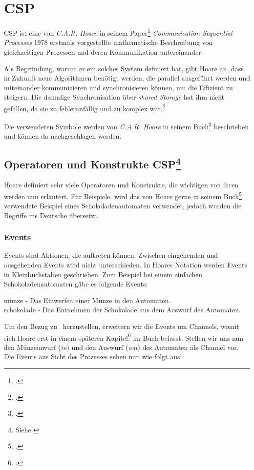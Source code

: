 \section{\acl{CSP}}
\acf{CSP} ist eine von \textit{C.A.R. Hoare} in seinem Paper\footcite{CSP} \textit{Communication Sequential Processes} 1978 erstmals vorgestellte mathematische Beschreibung von gleichzeitigen Prozessen und deren Kommunikation untereinander.

Als Begründung, warum er ein solches System definiert hat, gibt Hoare an, dass in Zukunft neue Algorithmen benötigt werden, die parallel ausgeführt werden und miteinander kommunizieren und synchronisieren können, um die Effizient zu steigern. Die damalige Synchronisation über \textit{shared Storage} hat ihm nicht gefallen, da sie zu fehleranfällig und zu komplex war.\footcite[Introduction]{CSP}

Die verwendeten Symbole werden von \textit{C.A.R. Hoare} in seinem Buch\footcite[Glossary of Symbols]{CSPBOOK} beschrieben und können da nachgeschlagen werden.
\subsection[Operatoren und Konstrukte \acs{CSP}]{Operatoren und Konstrukte \acs{CSP}\footnote{Siehe \cite[Kapitel 1.1]{CSPBOOK}}}

Hoare definiert sehr viele Operatoren und Konstrukte, die wichtigen von ihren werden nun erläutert. Für Beispiele, wird das von Hoare gerne in seinem Buch\footcite{CSPBOOK} verwendete Beispiel eines Schokoladenautomaten verwendet, jedoch wurden die Begriffe ins Deutsche übersetzt.

\subsubsection{Events}
Events sind Aktionen, die auftreten können. Zwischen eingehenden und ausgehenden Events wird nicht unterschieden. In Hoares Notation werden Events in Kleinbuchstaben geschrieben.
Zum Beispiel bei einem einfachen Schokoladenautomaten gäbe es folgende Events:

\begin{addmargin}[1cm]{0cm}
münze - Das Einwerfen einer Münze in den Automaten.\\
schokolade - Das Entnehmen der Schokolade aus dem Auswurf des Automaten.
\end{addmargin}

Um den Bezug zu \CA\ herzustellen, erweitern wir die Events um Channels, womit sich Hoare erst in einem späteren Kapitel\footcite[4.2]{CSPBOOK} im Buch befasst. Stellen wir uns nun den Münzeinwurf (\textit{in}) und den Auswurf (\textit{out}) des Automaten als Channel vor. Die Events aus Sicht des Prozesses sehen nun wie folgt aus:


